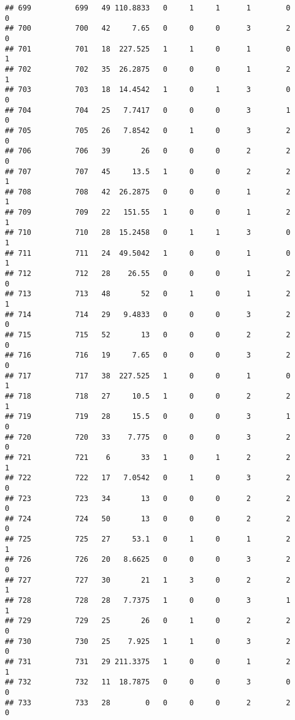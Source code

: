 \documentclass[
]{article}
\begin{document}
\begin{verbatim}
## 699          699   49 110.8833   0     1     1      1        0         0
## 700          700   42     7.65   0     0     0      3        2         0
## 701          701   18  227.525   1     1     0      1        0         1
## 702          702   35  26.2875   0     0     0      1        2         1
## 703          703   18  14.4542   1     0     1      3        0         0
## 704          704   25   7.7417   0     0     0      3        1         0
## 705          705   26   7.8542   0     1     0      3        2         0
## 706          706   39       26   0     0     0      2        2         0
## 707          707   45     13.5   1     0     0      2        2         1
## 708          708   42  26.2875   0     0     0      1        2         1
## 709          709   22   151.55   1     0     0      1        2         1
## 710          710   28  15.2458   0     1     1      3        0         1
## 711          711   24  49.5042   1     0     0      1        0         1
## 712          712   28    26.55   0     0     0      1        2         0
## 713          713   48       52   0     1     0      1        2         1
## 714          714   29   9.4833   0     0     0      3        2         0
## 715          715   52       13   0     0     0      2        2         0
## 716          716   19     7.65   0     0     0      3        2         0
## 717          717   38  227.525   1     0     0      1        0         1
## 718          718   27     10.5   1     0     0      2        2         1
## 719          719   28     15.5   0     0     0      3        1         0
## 720          720   33    7.775   0     0     0      3        2         0
## 721          721    6       33   1     0     1      2        2         1
## 722          722   17   7.0542   0     1     0      3        2         0
## 723          723   34       13   0     0     0      2        2         0
## 724          724   50       13   0     0     0      2        2         0
## 725          725   27     53.1   0     1     0      1        2         1
## 726          726   20   8.6625   0     0     0      3        2         0
## 727          727   30       21   1     3     0      2        2         1
## 728          728   28   7.7375   1     0     0      3        1         1
## 729          729   25       26   0     1     0      2        2         0
## 730          730   25    7.925   1     1     0      3        2         0
## 731          731   29 211.3375   1     0     0      1        2         1
## 732          732   11  18.7875   0     0     0      3        0         0
## 733          733   28        0   0     0     0      2        2         0

\end{verbatim}
\end{document}
